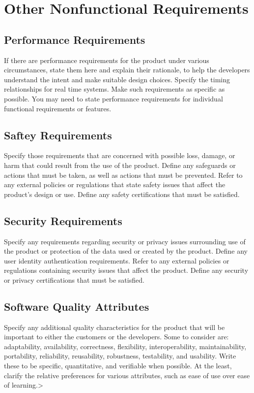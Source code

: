 \documentclass{scrreprt}
\begin{document}
    \chapter{Other Nonfunctional Requirements}
    \section{Performance Requirements} 
    If there are performance requirements for the product under various circumstances, state them here and explain their rationale, to help the developers understand the intent and make suitable design choices. Specify the timing relationships for real time systems. Make such requirements as specific as possible. You may need to state performance requirements for individual functional requirements or features. 
    \section{Saftey Requirements}
    Specify those requirements that are concerned with possible loss, damage, or harm that could result from the use of the product. Define any safeguards or actions that must be taken, as well as actions that must be prevented. Refer to any external policies or regulations that state safety issues that affect the product’s design or use. Define any safety certifications that must be satisfied. 
    \section{Security Requirements}
    Specify any requirements regarding security or privacy issues surrounding use of the product or protection of the data used or created by the product. Define any user identity authentication requirements. Refer to any external policies or regulations containing security issues that affect the product. Define any security or privacy certifications that must be satisfied. 
    \section{Software Quality Attributes}
    Specify any additional quality characteristics for the product that will be important to either the customers or the developers. Some to consider are: adaptability, availability, correctness, flexibility, interoperability, maintainability, portability, reliability, reusability, robustness, testability, and usability. Write these to be specific, quantitative, and verifiable when possible. At the least, clarify the relative preferences for various attributes, such as ease of use over ease of learning.>  
\end{document}
